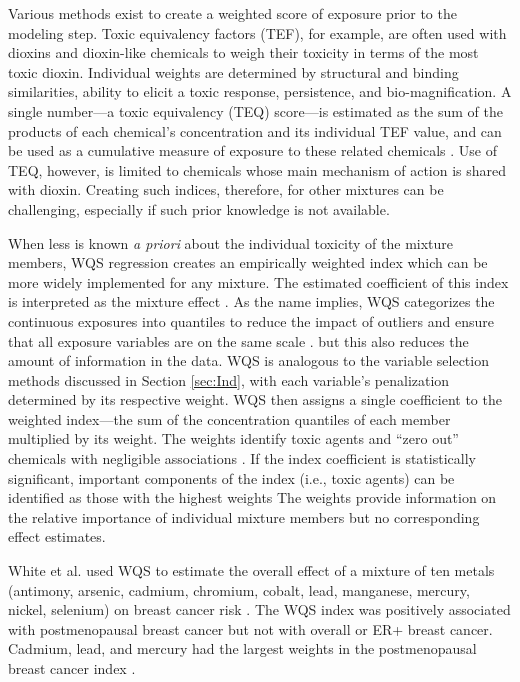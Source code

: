 Various methods exist to create a weighted score of exposure prior to the modeling step. Toxic equivalency factors (TEF), for example, are often used with dioxins and dioxin-like chemicals to weigh their toxicity in terms of the most toxic dioxin. Individual weights are determined by structural and binding similarities, ability to elicit a toxic response, persistence, and bio-magnification. A single number---a toxic equivalency (TEQ) score---is estimated as the sum of the products of each chemical's concentration and its individual TEF value, and can be used as a cumulative measure of exposure to these related chemicals \citep{van20062005, mitro2015cross}. Use of TEQ, however, is limited to chemicals whose main mechanism of action is shared with dioxin. Creating such indices, therefore, for other mixtures can be challenging, especially if such prior knowledge is not available.

When less is known \textit{a priori} about the individual toxicity of the mixture members, WQS regression creates an empirically weighted index which can be more widely implemented for any mixture. The estimated coefficient of this index is interpreted as the mixture effect \citep{carrico15}. As the name implies, WQS categorizes the continuous exposures into quantiles to reduce the impact of outliers and ensure that all exposure variables are on the same scale \citep{carrico15, gennings2013cohort}. but this also reduces the amount of information in the data. WQS is analogous to the variable selection methods discussed in Section \ref{sec:Ind}, with each variable's penalization determined by its respective weight. WQS then assigns a single coefficient to the weighted index---the sum of the concentration quantiles of each member multiplied by its weight. The weights identify toxic agents and ``zero out'' chemicals with negligible associations \citep{carrico15, christensen2013multiple}. If the index coefficient is statistically significant, important components of the index (i.e., toxic agents) can be identified as those with the highest weights \citep{carrico15} The weights provide information on the relative importance of individual mixture members but no corresponding effect estimates. 

White et al. used WQS to estimate the overall effect of a mixture of ten metals (antimony, arsenic, cadmium, chromium, cobalt, lead, manganese, mercury, nickel, selenium) on breast cancer risk \citep{white2018metallic}. The WQS index was positively associated with postmenopausal breast cancer but not with overall or ER+ breast cancer. Cadmium, lead, and mercury had the largest weights in the postmenopausal breast cancer index \citep{white2018metallic}.

